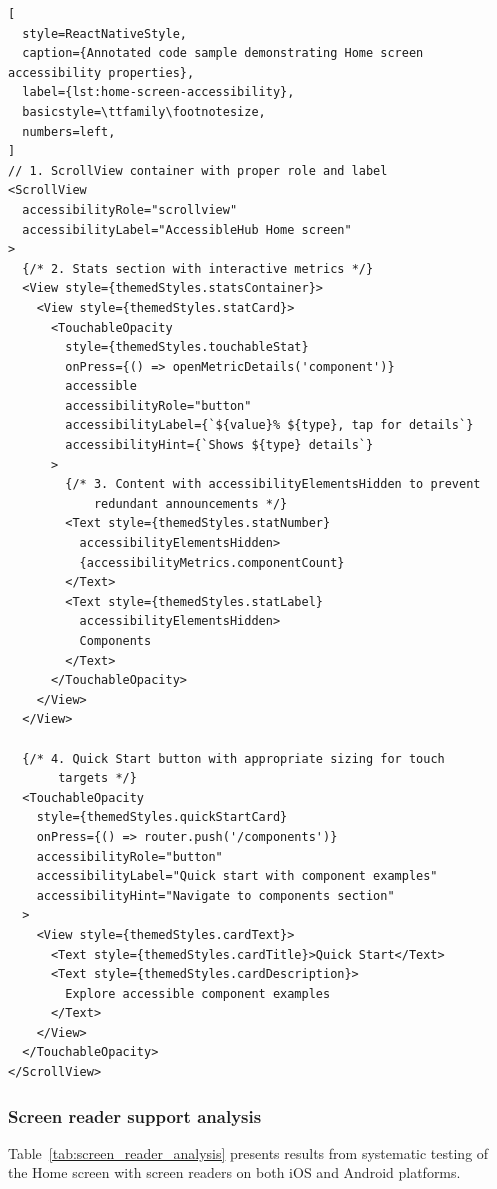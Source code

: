 \begin{lstlisting}[
  style=ReactNativeStyle,
  caption={Annotated code sample demonstrating Home screen accessibility properties},
  label={lst:home-screen-accessibility},
  basicstyle=\ttfamily\footnotesize,
  numbers=left,
]
// 1. ScrollView container with proper role and label
<ScrollView
  accessibilityRole="scrollview"
  accessibilityLabel="AccessibleHub Home screen"
>
  {/* 2. Stats section with interactive metrics */}
  <View style={themedStyles.statsContainer}>
    <View style={themedStyles.statCard}>
      <TouchableOpacity
        style={themedStyles.touchableStat}
        onPress={() => openMetricDetails('component')}
        accessible
        accessibilityRole="button"
        accessibilityLabel={`${value}% ${type}, tap for details`}
        accessibilityHint={`Shows ${type} details`}
      >
        {/* 3. Content with accessibilityElementsHidden to prevent 
            redundant announcements */}
        <Text style={themedStyles.statNumber} 
          accessibilityElementsHidden>
          {accessibilityMetrics.componentCount}
        </Text>
        <Text style={themedStyles.statLabel} 
          accessibilityElementsHidden>
          Components
        </Text>
      </TouchableOpacity>
    </View>
  </View>

  {/* 4. Quick Start button with appropriate sizing for touch 
       targets */}
  <TouchableOpacity
    style={themedStyles.quickStartCard}
    onPress={() => router.push('/components')}
    accessibilityRole="button"
    accessibilityLabel="Quick start with component examples"
    accessibilityHint="Navigate to components section"
  >
    <View style={themedStyles.cardText}>
      <Text style={themedStyles.cardTitle}>Quick Start</Text>
      <Text style={themedStyles.cardDescription}>
        Explore accessible component examples
      </Text>
    </View>
  </TouchableOpacity>
</ScrollView>
\end{lstlisting}

\subsubsection{Screen reader support analysis}

Table~\ref{tab:screen_reader_analysis} presents results from systematic testing of the Home screen with screen readers on both iOS and Android platforms.

